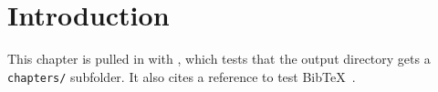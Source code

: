 \section{Introduction}
This chapter is pulled in with \verb||, which tests that the
output directory gets a \texttt{chapters/} subfolder. It also cites a
reference to test BibTeX~\cite{knuth1984}.
